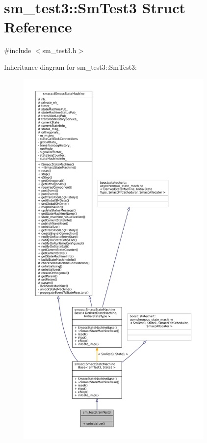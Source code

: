 \hypertarget{structsm__test3_1_1SmTest3}{}\section{sm\+\_\+test3\+:\+:Sm\+Test3 Struct Reference}
\label{structsm__test3_1_1SmTest3}


{\ttfamily \#include $<$sm\+\_\+test3.\+h$>$}



Inheritance diagram for sm\+\_\+test3\+:\+:Sm\+Test3\+:
\nopagebreak
\begin{figure}[H]
\begin{center}
\leavevmode
\includegraphics[height=550pt]{structsm__test3_1_1SmTest3__inherit__graph}
\end{center}
\end{figure}



